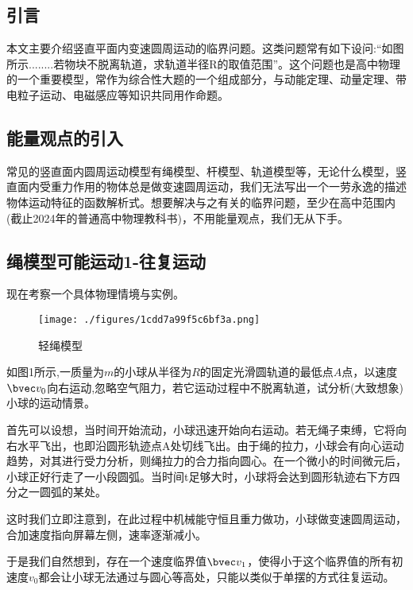 

\begin{issues}
\issueDraft
\issueTODO
\end{issues}

\subsection{引言}
本文主要介绍竖直平面内变速圆周运动的临界问题。这类问题常有如下设问:“如图所示........若物块不脱离轨道，求轨道半径R的取值范围”。这个问题也是高中物理的一个重要模型，常作为综合性大题的一个组成部分，与动能定理、动量定理、带电粒子运动、电磁感应等知识共同用作命题。

\subsection{能量观点的引入}
常见的竖直面内圆周运动模型有绳模型、杆模型、轨道模型等，无论什么模型，竖直面内受重力作用的物体总是做变速圆周运动，我们无法写出一个一劳永逸的描述物体运动特征的函数解析式。想要解决与之有关的临界问题，至少在高中范围内(截止2024年的普通高中物理教科书)，不用能量观点，我们无从下手。

\subsection{绳模型可能运动1-往复运动}
现在考察一个具体物理情境与实例。
\begin{figure}[ht]
\centering
\texttt{[image: ./figures/1cdd7a99f5c6bf3a.png]}
\caption{轻绳模型} \label{fig_CirVer_1}
\end{figure}
如图1所示,一质量为$m$的小球从半径为$R$的固定光滑圆轨道的最低点$A$点，以速度$\bvec v_0$向右运动,忽略空气阻力，若它运动过程中不脱离轨道，试分析(大致想象)小球的运动情景。

首先可以设想，当时间开始流动，小球迅速开始向右运动。若无绳子束缚，它将向右水平飞出，也即沿圆形轨迹点A处切线飞出。由于绳的拉力，小球会有向心运动趋势，对其进行受力分析，则绳拉力的合力指向圆心。在一个微小的时间微元后，小球正好行走了一小段圆弧。当时间t足够大时，小球将会达到圆形轨迹右下方四分之一圆弧的某处。

这时我们立即注意到，在此过程中机械能守恒且重力做功，小球做变速圆周运动，合加速度指向屏幕左侧，速率逐渐减小。

于是我们自然想到，存在一个速度临界值$\bvec v_1$，使得小于这个临界值的所有初速度$v_0$都会让小球无法通过与圆心等高处，只能以类似于单摆的方式往复运动。

